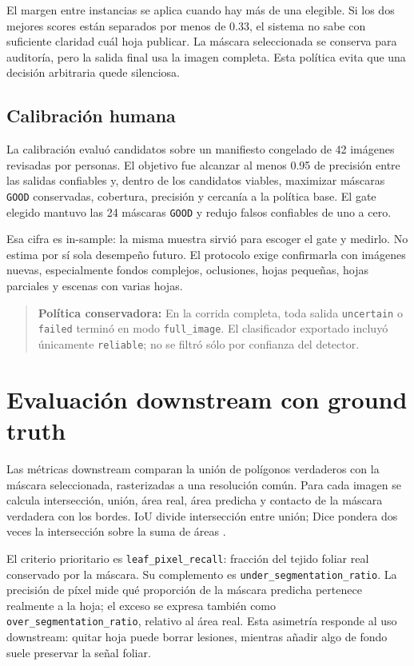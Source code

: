 \documentclass[11pt,a4paper]{article}
\begin{document}
El margen entre instancias se aplica cuando hay más de una elegible. Si los dos mejores scores están separados por menos de 0.33, el sistema no sabe con suficiente claridad cuál hoja publicar. La máscara seleccionada se conserva para auditoría, pero la salida final usa la imagen completa. Esta política evita que una decisión arbitraria quede silenciosa.


\subsection{Calibración humana}

La calibración evaluó candidatos sobre un manifiesto congelado de 42 imágenes revisadas por personas. El objetivo fue alcanzar al menos 0.95 de precisión entre las salidas confiables y, dentro de los candidatos viables, maximizar máscaras \texttt{GOOD} conservadas, cobertura, precisión y cercanía a la política base. El gate elegido mantuvo las 24 máscaras \texttt{GOOD} y redujo falsos confiables de uno a cero.


Esa cifra es in-sample: la misma muestra sirvió para escoger el gate y medirlo. No estima por sí sola desempeño futuro. El protocolo exige confirmarla con imágenes nuevas, especialmente fondos complejos, oclusiones, hojas pequeñas, hojas parciales y escenas con varias hojas.


\begin{quote}\textbf{Política conservadora:} En la corrida completa, toda salida \texttt{uncertain} o \texttt{failed} terminó en modo \texttt{full\_image}. El clasificador exportado incluyó únicamente \texttt{reliable}; no se filtró sólo por confianza del detector.\end{quote}

\section{Evaluación downstream con ground truth}

Las métricas downstream comparan la unión de polígonos verdaderos con la máscara seleccionada, rasterizadas a una resolución común. Para cada imagen se calcula intersección, unión, área real, área predicha y contacto de la máscara verdadera con los bordes. IoU divide intersección entre unión; Dice pondera dos veces la intersección sobre la suma de áreas \citep{dice1945}.


El criterio prioritario es \texttt{leaf\_pixel\_recall}: fracción del tejido foliar real conservado por la máscara. Su complemento es \texttt{under\_segmentation\_ratio}. La precisión de píxel mide qué proporción de la máscara predicha pertenece realmente a la hoja; el exceso se expresa también como \texttt{over\_segmentation\_ratio}, relativo al área real. Esta asimetría responde al uso downstream: quitar hoja puede borrar lesiones, mientras añadir algo de fondo suele preservar la señal foliar.
\end{document}
